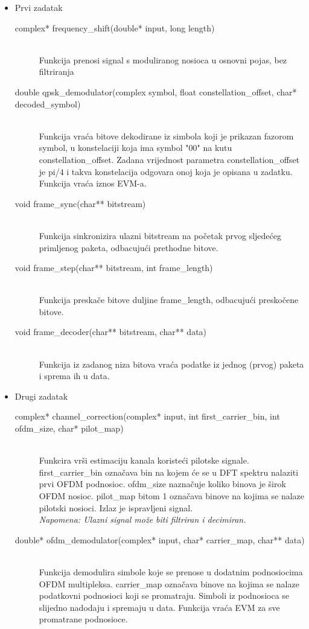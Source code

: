 \documentclass[a4paper]{article}
\begin{document}
\begin{itemize}
\item Prvi zadatak
	\begin{description}
	\item[complex* frequency\_shift(double* input, long length)]
	\,\\ Funkcija prenosi signal s moduliranog nosioca u osnovni pojas, bez filtriranja
	\item[double qpsk\_demodulator(complex symbol, float constellation\_offset, char* decoded\_symbol)]
	\,\\ Funkcija vraća bitove dekodirane iz simbola koji je prikazan fazorom symbol, u konstelaciji koja ima symbol "00" na kutu constellation\_offset. Zadana vrijednost parametra constellation\_offset je pi/4 i takva konstelacija odgovara onoj koja je opisana u zadatku. Funkcija vraća iznos EVM-a.
	\item[void frame\_sync(char** bitstream)]
	\,\\ Funkcija sinkronizira ulazni bitstream na početak prvog sljedećeg primljenog paketa, odbacujući prethodne bitove.
	\item[void frame\_step(char** bitstream, int frame\_length)]
	\,\\ Funkcija preskače bitove duljine frame\_length, odbacujući preskočene bitove.
	\item[void frame\_decoder(char** bitstream, char** data)]
	\,\\ Funkcija iz zadanog niza bitova vraća podatke iz jednog (prvog) paketa i sprema ih u data.
	\end{description}
\item Drugi zadatak
	\begin{description}
	\item[complex* channel\_correction(complex* input, int first\_carrier\_bin, int ofdm\_size, char* pilot\_map)]
	\,\\ Funkcira vrši estimaciju kanala koristeći pilotske signale. first\_carrier\_bin označava bin na kojem će se u DFT spektru nalaziti prvi OFDM podnosioc. ofdm\_size naznačuje koliko binova je širok OFDM nosioc. pilot\_map bitom 1 označava binove na kojima se nalaze pilotski nosioci. Izlaz je ispravljeni signal.
	\\ \textit{Napomena: Ulazni signal može biti filtriran i decimiran.}
	\item[double* ofdm\_demodulator(complex* input, char* carrier\_map, char** data)]
	\,\\ Funkcija demodulira simbole koje se prenose u dodatnim podnosiocima OFDM multipleksa. carrier\_map označava binove na kojima se nalaze podatkovni podnosioci koji se promatraju. Simboli iz podnosioca se slijedno nadodaju i spremaju u data. Funkcija vraća EVM za sve promatrane podnosioce.

\end{description}
\end{itemize}
\end{document}
